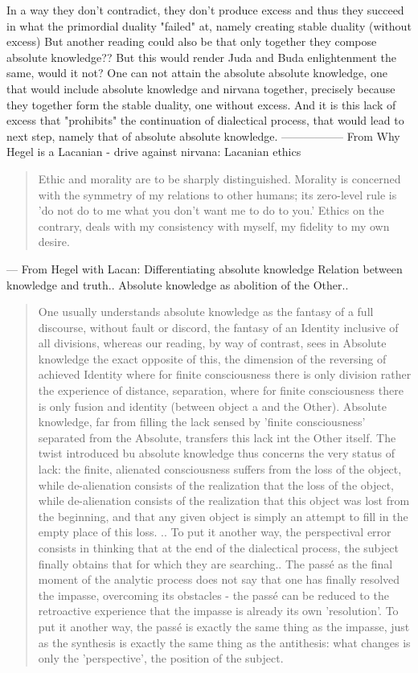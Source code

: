 \documentclass[10pt]{book}
\begin{document}
In a way they don't contradict, they don't produce excess and thus they succeed in what the primordial duality "failed" at, namely creating stable duality (without excess)
But another reading could also be that only together they compose absolute knowledge?? But this would render Juda and Buda enlightenment the same, would it not?
One can not attain the absolute absolute knowledge, one that would include absolute knowledge and nirvana together, precisely because they together form the stable duality, one without excess. And it is this lack of excess that "prohibits" the continuation of dialectical process, that would lead to next step, namely that of absolute absolute knowledge.
-----------------
From Why Hegel is a Lacanian - drive against nirvana: Lacanian ethics
\begin{quotation}
Ethic and morality are to be sharply distinguished. Morality is concerned with the symmetry of my relations to other humans; its zero-level rule is 'do not do to me what you don't want me to do to you.' Ethics on the contrary, deals with my consistency with myself, my fidelity to my own desire.
\end{quotation}
---
From Hegel with Lacan: Differentiating absolute knowledge
Relation between knowledge and truth..
Absolute knowledge as abolition of the Other..
\begin{quotation}
One usually understands absolute knowledge as the fantasy of a full discourse, without fault or discord, the fantasy of an Identity inclusive of all divisions, whereas our reading, by way of contrast, sees in Absolute knowledge the exact opposite of this, the dimension of the reversing of achieved Identity where for finite consciousness there is only division rather the experience of distance, separation, where for finite consciousness there is only fusion and identity (between object a and the Other). Absolute knowledge, far from filling the lack sensed by 'finite consciousness' separated from the Absolute, transfers this lack int the Other itself. The twist introduced bu absolute knowledge thus concerns the very status of lack: the finite, alienated consciousness suffers from the loss of the object, while de-alienation consists of the realization that the loss of the object, while de-alienation consists of the realization that this object was lost from the beginning, and that any given object is simply an attempt to fill in the empty place of this loss.
.. To put it another way, the perspectival error consists in thinking that at the end of the dialectical process, the subject finally obtains that for which they are searching..
The pass\'e as the final moment of the analytic process does not say that one has finally resolved the impasse, overcoming its obstacles - the pass\'e can be reduced to the retroactive experience that the impasse is already its own 'resolution'. To put it another way, the pass\'e is exactly the same thing as the impasse, just as the synthesis is exactly the same thing as the antithesis: what changes is only the 'perspective', the position of the subject.
\end{quotation}
\end{document}
